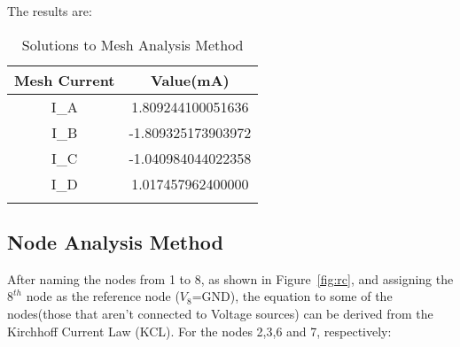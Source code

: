 


The results are:

\begin{table}[H]


\label{tab:tables}
\begin{center}
\begin{tabular}{|c|c|} 
 \hline
 \rowcolor{gray!50}
  Mesh Current & Value\hspace{1mm}(mA)\\
 \hline
 I_{A} & 1.809244100051636 \\
     \rowcolor{LightGray}
 I_{B} &-1.809325173903972\\
 I_{C} &-1.040984044022358\\
 \rowcolor{LightGray}
 I_{D} &1.017457962400000\\
  \rowcolor{LightGray}

    
 

 \hline
\end{tabular}
\caption{Solutions to Mesh Analysis Method}
\label{table:tab2}
\end{center}
\end{table}

\subsection{Node Analysis Method}

After naming the nodes from 1 to 8, as shown in Figure~\ref{fig:rc}, and assigning the $8^{th}$ node as the reference node ($V_{8}$=GND), the equation to some of the nodes(those that aren't connected to Voltage sources) can be derived from the  Kirchhoff Current Law (KCL).
For the nodes 2,3,6 and 7, respectively:

